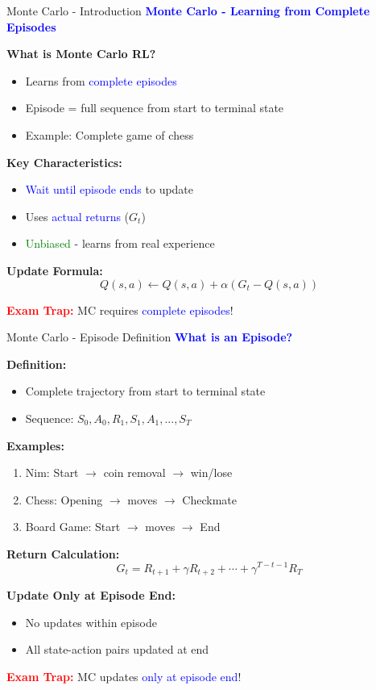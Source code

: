 \documentclass[8pt]{beamer}
\begin{document}
	\begin{frame}{Monte Carlo - Introduction}
		\fontsize{6.5}{7.5}\selectfont
		\textcolor{blue}{\textbf{Monte Carlo - Learning from Complete Episodes}}
		
		\textbf{What is Monte Carlo RL?}
		\begin{itemize}
			\item Learns from \textcolor{blue}{complete episodes}
			\item Episode = full sequence from start to terminal state
			\item Example: Complete game of chess
		\end{itemize}
		
		\textbf{Key Characteristics:}
		\begin{itemize}
			\item \textcolor{blue}{Wait until episode ends} to update
			\item Uses \textcolor{blue}{actual returns} ($G_t$)
			\item \textcolor{green}{Unbiased} - learns from real experience
		\end{itemize}
		
		\textbf{Update Formula:}
		\[
		Q(s,a) \leftarrow Q(s,a) + \alpha(G_t - Q(s,a))
		\]
		
		\textcolor{red}{\textbf{Exam Trap:}} MC requires \textcolor{blue}{complete episodes}!
	\end{frame}
	
	\begin{frame}{Monte Carlo - Episode Definition}
		\fontsize{6.5}{7.5}\selectfont
		\textcolor{blue}{\textbf{What is an Episode?}}
		
		\textbf{Definition:}
		\begin{itemize}
			\item Complete trajectory from start to terminal state
			\item Sequence: $S_0, A_0, R_1, S_1, A_1, ..., S_T$
		\end{itemize}
		
		\textbf{Examples:}
		\begin{enumerate}
			\item Nim: Start $\rightarrow$ coin removal $\rightarrow$ win/lose
			\item Chess: Opening $\rightarrow$ moves $\rightarrow$ Checkmate
			\item Board Game: Start $\rightarrow$ moves $\rightarrow$ End
		\end{enumerate}
		
		\textbf{Return Calculation:}
		\[
		G_t = R_{t+1} + \gamma R_{t+2} + \cdots + \gamma^{T-t-1}R_T
		\]
		
		\textbf{Update Only at Episode End:}
		\begin{itemize}
			\item No updates within episode
			\item All state-action pairs updated at end
		\end{itemize}
		
		\textcolor{red}{\textbf{Exam Trap:}} MC updates \textcolor{blue}{only at episode end}!
	\end{frame}
	
\end{document}
